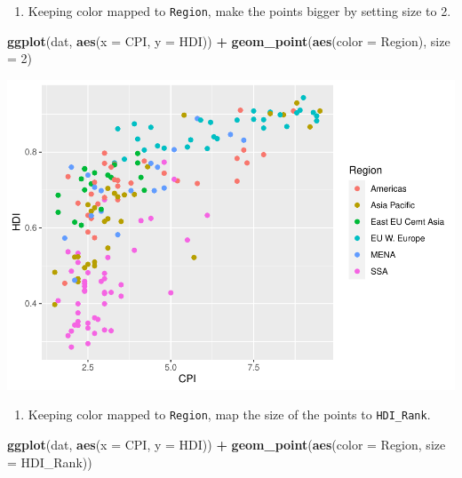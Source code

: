 \documentclass[
]{book}
\newenvironment{Shaded}{\begin{snugshade}}{\end{snugshade}}
\newcommand{\DataTypeTok}[1]{\textcolor[rgb]{0.13,0.29,0.53}{#1}}
\newcommand{\DecValTok}[1]{\textcolor[rgb]{0.00,0.00,0.81}{#1}}
\newcommand{\KeywordTok}[1]{\textcolor[rgb]{0.13,0.29,0.53}{\textbf{#1}}}
\newcommand{\NormalTok}[1]{#1}
\newcommand{\OperatorTok}[1]{\textcolor[rgb]{0.81,0.36,0.00}{\textbf{#1}}}
\newcommand{\StringTok}[1]{\textcolor[rgb]{0.31,0.60,0.02}{#1}}
\providecommand{\tightlist}{%
  \setlength{\itemsep}{0pt}\setlength{\parskip}{0pt}}
\begin{document}
\begin{alert}
\begin{enumerate}
\def\labelenumi{\arabic{enumi}.}
\setcounter{enumi}{3}
\tightlist
\item
  Keeping color mapped to \texttt{Region}, make the points bigger by setting size to 2.
\end{enumerate}

\begin{Shaded}
\begin{Highlighting}[]
\KeywordTok{ggplot}\NormalTok{(dat, }\KeywordTok{aes}\NormalTok{(}\DataTypeTok{x =}\NormalTok{ CPI, }\DataTypeTok{y =}\NormalTok{ HDI)) }\OperatorTok{+}
\StringTok{  }\KeywordTok{geom\_point}\NormalTok{(}\KeywordTok{aes}\NormalTok{(}\DataTypeTok{color =}\NormalTok{ Region), }\DataTypeTok{size =} \DecValTok{2}\NormalTok{)}
\end{Highlighting}
\end{Shaded}

\includegraphics{R/Rgraphics/figures/unnamed-chunk-162-1.pdf}

\begin{enumerate}
\def\labelenumi{\arabic{enumi}.}
\setcounter{enumi}{4}
\tightlist
\item
  Keeping color mapped to \texttt{Region}, map the size of the points to \texttt{HDI\_Rank}.
\end{enumerate}

\begin{Shaded}
\begin{Highlighting}[]
\KeywordTok{ggplot}\NormalTok{(dat, }\KeywordTok{aes}\NormalTok{(}\DataTypeTok{x =}\NormalTok{ CPI, }\DataTypeTok{y =}\NormalTok{ HDI)) }\OperatorTok{+}
\KeywordTok{geom\_point}\NormalTok{(}\KeywordTok{aes}\NormalTok{(}\DataTypeTok{color =}\NormalTok{ Region, }\DataTypeTok{size =}\NormalTok{  HDI\_Rank))}
\end{Highlighting}
\end{Shaded}


\end{alert}
\end{document}

